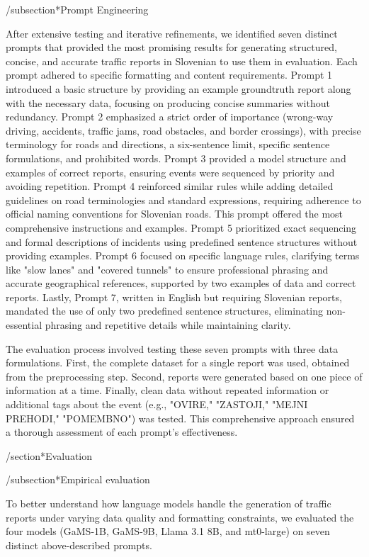 /subsection*{Prompt Engineering}

After extensive testing and iterative refinements, we identified seven distinct prompts that provided the most promising results for generating structured, concise, and accurate traffic reports in Slovenian to use them in evaluation. Each prompt adhered to specific formatting and content requirements. Prompt 1 introduced a basic structure by providing an example groundtruth report along with the necessary data, focusing on producing concise summaries without redundancy. Prompt 2 emphasized a strict order of importance (wrong-way driving, accidents, traffic jams, road obstacles, and border crossings), with precise terminology for roads and directions, a six-sentence limit, specific sentence formulations, and prohibited words. Prompt 3 provided a model structure and examples of correct reports, ensuring events were sequenced by priority and avoiding repetition. Prompt 4 reinforced similar rules while adding detailed guidelines on road terminologies and standard expressions, requiring adherence to official naming conventions for Slovenian roads. This prompt offered the most comprehensive instructions and examples. Prompt 5 prioritized exact sequencing and formal descriptions of incidents using predefined sentence structures without providing examples. Prompt 6 focused on specific language rules, clarifying terms like "slow lanes" and "covered tunnels" to ensure professional phrasing and accurate geographical references, supported by two examples of data and correct reports. Lastly, Prompt 7, written in English but requiring Slovenian reports, mandated the use of only two predefined sentence structures, eliminating non-essential phrasing and repetitive details while maintaining clarity.

The evaluation process involved testing these seven prompts with three data formulations. First, the complete dataset for a single report was used, obtained from the preprocessing step. Second, reports were generated based on one piece of information at a time. Finally, clean data without repeated information or additional tags about the event (e.g., "OVIRE," "ZASTOJI," "MEJNI PREHODI," "POMEMBNO") was tested. This comprehensive approach ensured a thorough assessment of each prompt's effectiveness.

/section*{Evaluation}

/subsection*{Empirical evaluation}

To better understand how language models handle the generation of traffic reports under varying data quality and formatting constraints, we evaluated the four models (GaMS-1B, GaMS-9B, Llama 3.1 8B, and mt0-large) on seven distinct above-described prompts.

